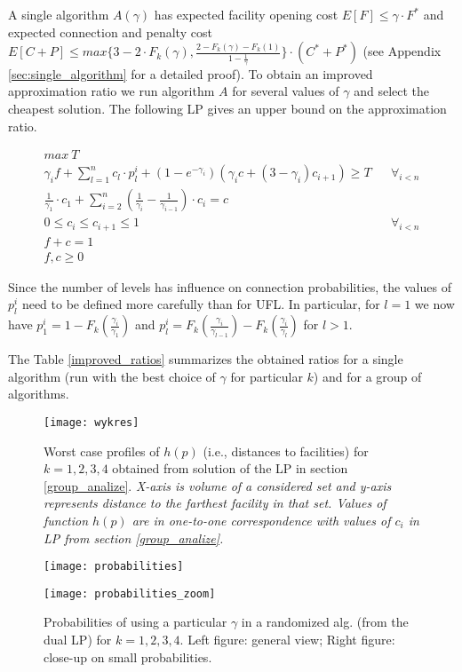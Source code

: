 \documentclass{llncs}
\newcommand{\va}[1]{{\color{black}\sl  #1}}
\begin{document}
A single algorithm $A(\gamma)$ has expected facility opening cost $E[F]\leq \gamma \cdot F^*$ and expected connection and penalty cost $E[C+P] \leq max \{3 - 2 \cdot F_k(\gamma), \frac{2 - F_k(\gamma) - F_k(1)}{1 - \frac{1}{\gamma}}\} \cdot (C^* + P^*)$ (see Appendix \ref{sec:single_algorithm} for a detailed proof). To obtain an improved approximation ratio we run algorithm $A$ for several values of $\gamma$ and select the cheapest solution. The following LP gives an upper bound on the approximation ratio.

\begin{eqnarray}
  \label{k_lp:max}
  max~T && \\
\label{k_lp:t_upperbound}
  \gamma_i f + \sum_{l = 1}^{n} c_l \cdot p_l^i + (1 - e^{-\gamma_i}) (\gamma_i c + (3 - \gamma_i)c_{i+1}) \geq T &&  \forall_{i < n}\\
\label{k_lp:c_constraint}
  \frac{1}{\gamma_1} \cdot c_1 + \sum_{i = 2}^{n}(\frac{1}{\gamma_i} - \frac{1}{\gamma_{i-1}}) \cdot c_i = c && \\
\label{k_lp:c_order}
  0 \leq c_i \leq c_{i+1} \leq 1&&\forall_{i < n}\\
\label{k_lp:opt_sol}
  f + c = 1 && \\
f, c\geq 0 &&
\end{eqnarray}

Since the number of levels has influence on connection probabilities, the values of $p_l^i$ need to be defined more carefully than for UFL.
In particular, for $l = 1$ we now have $p_1^i = 1 - F_k(\frac{\gamma_i}{\gamma_1})$ and $p_l^i = F_k(\frac{\gamma_i}{\gamma_{l-1}}) - F_k(\frac{\gamma_i}{\gamma_{l}})$ for $l > 1$.

The Table \ref{improved_ratios} summarizes the obtained ratios for a single algorithm (run with the best choice of $\gamma$ for particular $k$) and for a group of algorithms.

\begin{figure}
  \centering
  \texttt{[image: wykres]}
  \caption{Worst case profiles of $h(p)$ (i.e., distances to facilities) for $k = 1, 2, 3, 4$ obtained from solution of the LP in section \ref{group_analize}. \va{X-axis is volume of a considered set and y-axis represents distance to the farthest facility in that set. Values of function $h(p)$ are in one-to-one correspondence with values of $c_i$ in LP from section \ref{group_analize}.}}
  \label{fig:hardcase}
\end{figure}
\begin{figure}
\begin{minipage}{6cm}
  \centering
  \texttt{[image: probabilities]}
\end{minipage}
\begin{minipage}{6cm}
  \centering
  \texttt{[image: probabilities\_zoom]}
\end{minipage}
 \caption{Probabilities of using a particular $\gamma$ in a randomized alg. (from the dual LP) for $k = 1, 2, 3, 4$.
 Left figure: general view; Right figure: close-up on small probabilities.}
  \label{fig:probabilities}
\end{figure}
\end{document}
